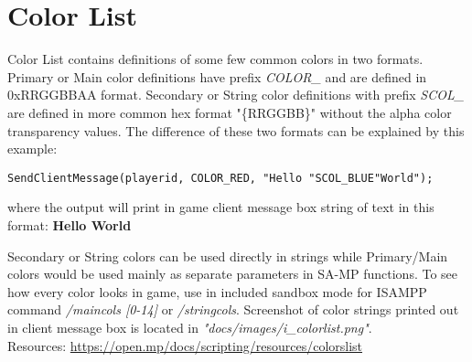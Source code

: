 \documentclass{article}
\begin{document}
\section{Color List}
Color List contains definitions of some few common colors in two formats. Primary or Main color definitions have prefix \textit{COLOR\_} and are defined in 0xRRGGBBAA format. Secondary or String color definitions with prefix \textit{SCOL\_} are defined in more common hex format "\{RRGGBB\}" without the alpha color transparency values. The difference of these two formats can be explained by this example:
\begin{verbatim}
SendClientMessage(playerid, COLOR_RED, "Hello "SCOL_BLUE"World");
\end{verbatim}
\begin{sloppypar}
\noindent where the output will print in game client message box string of text in this format:
\textbf{\color{red}Hello \color{blue}World}
\end{sloppypar}
\bigskip
Secondary or String colors can be used directly in strings while Primary/Main colors would be used mainly as separate parameters in SA-MP functions. To see how every color looks in game, use in included sandbox mode for ISAMPP command \textit{/maincols [0-14]} or \textit{/stringcols}. Screenshot of color strings printed out in client message box is located in \textit{"docs/images/i\_colorlist.png"}.
\bigskip
\\Resources: \url{https://open.mp/docs/scripting/resources/colorslist}


\newpage
\end{document}
